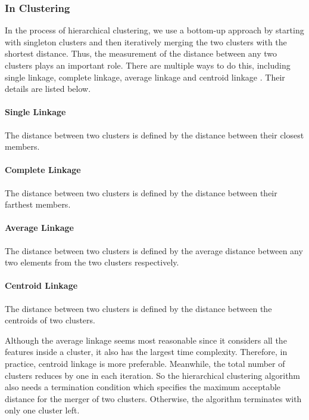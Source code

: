 \documentclass[twoside,11pt]{article}
\begin{document}
\subsubsection{In Clustering}\label{in_clustering}
In the process of hierarchical clustering, we use a bottom-up approach by starting with singleton clusters and then iteratively merging the two clusters with the shortest distance. Thus, the measurement of the distance between any two clusters plays an important role. There are multiple ways to do this, including single linkage, complete linkage, average linkage and centroid linkage \citep{han2011data}. Their details are listed below.

\paragraph{Single Linkage}
The distance between two clusters is defined by the distance between their closest members.
\paragraph{Complete Linkage}
The distance between two clusters is defined by the distance between their farthest members.
\paragraph{Average Linkage}
The distance between two clusters is defined by the average distance between any two elements from the two clusters respectively.
\paragraph{Centroid Linkage}
The distance between two clusters is defined by the distance between the centroids of two clusters.

Although the average linkage seems most reasonable since it considers all the features inside a cluster, it also has the largest time complexity. Therefore, in practice, centroid linkage is more preferable. Meanwhile, the total number of clusters reduces by one in each iteration. So the hierarchical clustering algorithm also needs a termination condition which specifies the maximum acceptable distance for the merger of two clusters. Otherwise, the algorithm terminates with only one cluster left.
\end{document}
